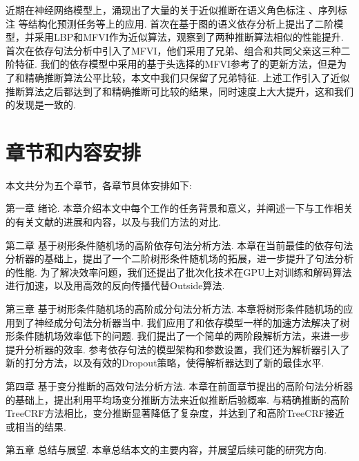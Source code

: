 近期在神经网络模型上，涌现出了大量的关于近似推断在语义角色标注 \citep{li-etal-2020-high}、序列标注 \citep{wang-etal-2020-ain}等结构化预测任务等上的应用.
\citet{wang-etal-2019-second}首次在基于图的语义依存分析上提出了二阶模型，并采用LBP和MFVI作为近似算法，观察到了两种推断算法相似的性能提升.
\citet{wang-tu-2020-second}首次在依存句法分析中引入了MFVI，他们采用了兄弟、组合和共同父亲这三种二阶特征.
我们的依存模型中采用的基于头选择的MFVI参考了\citet{wang-tu-2020-second}的更新方法，但是为了和精确推断算法公平比较，本文中我们只保留了兄弟特征.
上述工作引入了近似推断算法之后都达到了和精确推断可比较的结果，同时速度上大大提升，这和我们的发现是一致的.

\section{章节和内容安排}

本文共分为五个章节，各章节具体安排如下:

第一章 绪论.
本章介绍本文中每个工作的任务背景和意义，并阐述一下与工作相关的有关文献的进展和内容，以及与我们方法的对比.

第二章 基于树形条件随机场的高阶依存句法分析方法.
本章在当前最佳的依存句法分析器的基础上，提出了一个二阶树形条件随机场的拓展，进一步提升了句法分析的性能.
为了解决效率问题，我们还提出了批次化技术在GPU上对训练和解码算法进行加速，以及用高效的反向传播代替Outside算法.

第三章 基于树形条件随机场的高阶成分句法分析方法.
本章将树形条件随机场的应用到了神经成分句法分析器当中.
我们应用了和依存模型一样的加速方法解决了树形条件随机场效率低下的问题.
我们提出了一个简单的两阶段解析方法，来进一步提升分析器的效率.
参考依存句法的模型架构和参数设置，我们还为解析器引入了新的打分方法，以及有效的Dropout策略，使得解析器达到了新的最佳水平.

第四章 基于变分推断的高效句法分析方法.
本章在前面章节提出的高阶句法分析器的基础上，提出利用平均场变分推断方法来近似推断后验概率.
与精确推断的高阶TreeCRF方法相比，变分推断显著降低了复杂度，并达到了和高阶TreeCRF接近或相当的结果.

第五章 总结与展望.
本章总结本文的主要内容，并展望后续可能的研究方向.
